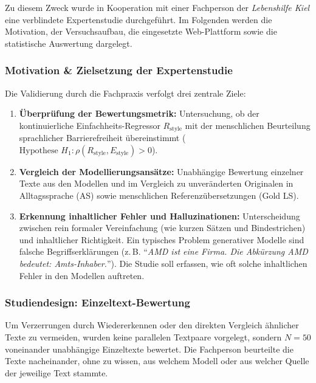 Zu diesem Zweck wurde in Kooperation mit einer Fachperson der \textit{Lebenshilfe Kiel} eine verblindete Expertenstudie durchgeführt. Im Folgenden werden die Motivation, der Versuchsaufbau, die eingesetzte Web-Plattform sowie die statistische Auswertung dargelegt.

\subsubsection{Motivation \& Zielsetzung der Expertenstudie}
\label{sec:experten_motivation}

Die Validierung durch die Fachpraxis verfolgt drei zentrale Ziele:
\begin{enumerate}
    \item \textbf{Überprüfung der Bewertungsmetrik:} Untersuchung, ob der kontinuierliche Einfachheits-Regressor $R_{\text{style}}$ mit der menschlichen Beurteilung sprachlicher Barrierefreiheit übereinstimmt ($\text{Hypothese } H_1: \rho(R_{\text{style}}, E_{\text{style}}) > 0$).
    \item \textbf{Vergleich der Modellierungsansätze:} Unabhängige Bewertung einzelner Texte aus den Modellen  und  im Vergleich zu unveränderten Originalen in Alltagssprache (AS) sowie menschlichen Referenzübersetzungen (Gold LS).
    \item \textbf{Erkennung inhaltlicher Fehler und Halluzinationen:} Unterscheidung zwischen rein formaler Vereinfachung (wie kurzen Sätzen und Bindestrichen) und inhaltlicher Richtigkeit. Ein typisches Problem generativer Modelle sind falsche Begriffserklärungen (z.\,B. \enquote{\textit{AMD ist eine Firma. Die Abkürzung AMD bedeutet: Amts-Inhaber.}}). Die Studie soll erfassen, wie oft solche inhaltlichen Fehler in den Modellen auftreten.
\end{enumerate}

\subsubsection{Studiendesign: Einzeltext-Bewertung}
\label{sec:experten_design}

Um Verzerrungen durch Wiedererkennen oder den direkten Vergleich ähnlicher Texte zu vermeiden, wurden keine parallelen Textpaare vorgelegt, sondern $N = 50$ voneinander unabhängige Einzeltexte bewertet. Die Fachperson beurteilte die Texte nacheinander, ohne zu wissen, aus welchem Modell oder aus welcher Quelle der jeweilige Text stammte. 

